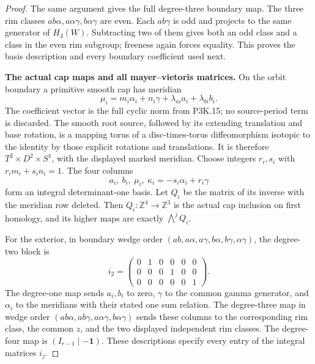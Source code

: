 \begin{proof}
The same argument gives the full degree-three boundary map.
The three rim classes \(ab\alpha,a\alpha\gamma,b\alpha\gamma\)
are even.  Each \(ab\gamma\) is odd and projects to the same
generator of \(H_3(W)\).  Subtracting two of them gives both an
odd class and a class in the even rim subgroup; freeness again
forces equality.  This proves the basis description and every
boundary coefficient used next.

\par\medskip\noindent\textbf{The actual cap maps and all mayer--vietoris matrices.}\enspace
On the orbit boundary a primitive smooth cap has meridian
\[
 \mu_i=m_i\alpha_i+n_i\gamma+\lambda_{ai}a_i+\lambda_{bi}b_i.
\]
The coefficient vector is the full cyclic norm from P3K.15; no
source-period term is discarded.  The smooth root source, followed
by its extending translation and base rotation, is a mapping torus
of a disc-times-torus diffeomorphism isotopic to the identity by
those explicit rotations and translations.  It is therefore
\(T^2\times D^2\times S^1\), with the displayed marked meridian.
Choose integers \(r_i,s_i\) with \(r_im_i+s_in_i=1\).
The four columns
\[
 a_i,\ b_i,\ \mu_i,\ \kappa_i=-s_i\alpha_i+r_i\gamma
\]
form an integral determinant-one basis.  Let \(Q_i\) be the
matrix of its inverse with the meridian row deleted.  Then
\(Q_i:\mathbb Z^4\to\mathbb Z^3\) is the actual cap inclusion
on first homology, and its higher maps are exactly
\(\bigwedge^jQ_i\).

For the exterior, in boundary wedge order
\((ab,a\alpha,a\gamma,b\alpha,b\gamma,\alpha\gamma)\), the
degree-two block is
\[
 i_2=\begin{pmatrix}
 0&1&0&0&0&0\\0&0&0&1&0&0\\0&0&0&0&0&1
 \end{pmatrix}.
\]
The degree-one map sends \(a_i,b_i\) to zero, \(\gamma\) to
the common gamma generator, and \(\alpha_i\) to the meridians with
their stated one sum relation.  The degree-three map in wedge order
\((ab\alpha,ab\gamma,a\alpha\gamma,b\alpha\gamma)\) sends
these columns to the corresponding rim class, the common \(z\),
and the two displayed independent rim classes.  The degree-four
map is \((I_{r-1}\mid-\mathbf1)\).  These descriptions specify
every entry of the integral matrices \(i_j\).


\end{proof}
